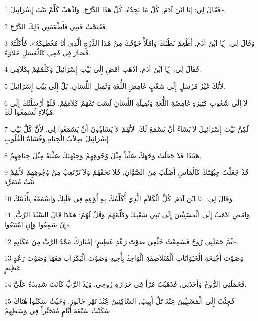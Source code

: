 \par 1 فَقَالَ لِي: [يَا ابْنَ آدَمَ, كُلْ مَا تَجِدُهُ. كُلْ هَذَا الدَّرْجَ, وَاذْهَبْ كَلِّمْ بَيْتَ إِسْرَائِيلَ».
\par 2 فَفَتَحْتُ فَمِي فَأَطْعَمَنِي ذَلِكَ الدَّرْجَ.
\par 3 وَقَالَ لِي: [يَا ابْنَ آدَمَ, أَطْعِمْ بَطْنَكَ وَامْلَأْ جَوْفَكَ مِنْ هَذَا الدَّرْجِ الَّذِي أَنَا مُعْطِيكَهُ». فَأَكَلْتُهُ فَصَارَ فِي فَمِي كَالْعَسَلِ حَلاَوَةً.
\par 4 فَقَالَ لِي: [يَا ابْنَ آدَمَ, اذْهَبِ امْضِ إِلَى بَيْتِ إِسْرَائِيلَ وَكَلِّمْهُمْ بِكَلاَمِي.
\par 5 لأَنَّكَ غَيْرُ مُرْسَلٍ إِلَى شَعْبٍ غَامِضِ اللُّغَةِ وَثَقِيلِ اللِّسَانِ, بَلْ إِلَى بَيْتِ إِسْرَائِيلَ.
\par 6 لاَ إِلَى شُعُوبٍ كَثِيرَةٍ غَامِضَةِ اللُّغَةِ وَثَقِيلَةِ اللِّسَانِ لَسْتَ تَفْهَمُ كَلاَمَهُمْ. فَلَوْ أَرْسَلْتُكَ إِلَى هَؤُلاَءِ لَسَمِعُوا لَكَ.
\par 7 لَكِنَّ بَيْتَ إِسْرَائِيلَ لاَ يَشَاءُ أَنْ يَسْمَعَ لَكَ, لأَنَّهُمْ لاَ يَشَاؤُونَ أَنْ يَسْمَعُوا لِي. لأَنَّ كُلَّ بَيْتِ إِسْرَائِيلَ صِلاَبُ الْجِبَاهِ وَقُسَاةُ الْقُلُوبِ.
\par 8 هَئَنَذَا قَدْ جَعَلْتُ وَجْهَكَ صُلْباً مِثْلَ وُجُوهِهِمْ وَجِبْهَتَكَ صُلْبَةً مِثْلَ جِبَاهِهِمْ,
\par 9 قَدْ جَعَلْتُ جِبْهَتَكَ كَالْمَاسِ أَصْلَبَ مِنَ الصَّوَّانِ, فَلاَ تَخَفْهُمْ وَلاَ تَرْتَعِبْ مِنْ وُجُوهِهِمْ لأَنَّهُمْ بَيْتٌ مُتَمَرِّد
\par 10 وَقَالَ لِي: [يَا ابْنَ آدَمَ, كُلُّ الْكَلاَمِ الَّذِي أُكَلِّمُكَ بِهِ أَوْعِهِ فِي قَلْبِكَ وَاسْمَعْهُ بِأُذُنَيْكَ.
\par 11 وَامْضِ اذْهَبْ إِلَى الْمَسْبِيِّينَ إِلَى بَنِي شَعْبِكَ وَكَلِّمْهُمْ وَقُلْ لَهُمْ: هَكَذَا قَالَ السَّيِّدُ الرَّبُّ, إِنْ سَمِعُوا وَإِنِ امْتَنَعُوا».
\par 12 ثُمَّ حَمَلَنِي رُوحٌ فَسَمِعْتُ خَلْفِي صَوْتَ رَعْدٍ عَظِيمٍ: [مُبَارَكٌ مَجْدُ الرَّبِّ مِنْ مَكَانِهِ».
\par 13 وَصَوْتَ أَجْنِحَةِ الْحَيَوَانَاتِ الْمُتَلاَصِقَةِ الْوَاحِدُ بِأَخِيهِ وَصَوْتَ الْبَكَرَاتِ مَعَهَا وَصَوْتَ رَعْدٍ عَظِيمٍ.
\par 14 فَحَمَلَنِي الرُّوحُ وَأَخَذَنِي, فَذَهَبْتُ مُرّاً فِي حَرَارَةِ رُوحِي, وَيَدُ الرَّبِّ كَانَتْ شَدِيدَةً عَلَيَّ.
\par 15 فَجِئْتُ إِلَى الْمَسْبِيِّينَ عِنْدَ تَلِّ أَبِيبَ, السَّاكِنِينَ عَُِنْدَ نَهْرِ خَابُورَ. وَحَيْثُ سَكَنُوا هُنَاكَ سَكَنْتُ سَبْعَةَ أَيَّامٍ مُتَحَيِّراً فِي وَسَطِهِمْ.
